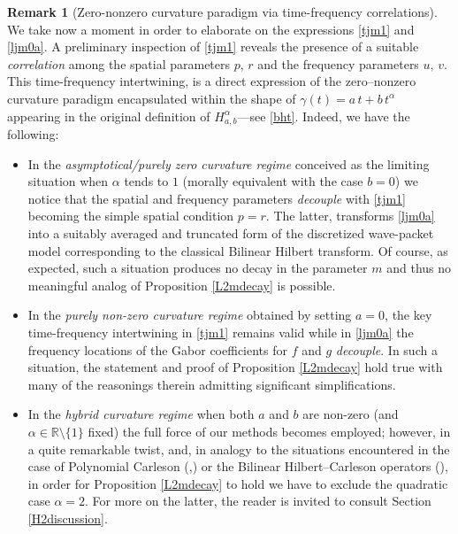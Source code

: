 \documentclass[a4paper,reqno]{amsart}
\numberwithin{equation}{section}
\theoremstyle{definition}
\newtheorem{remark}[theorem]{Remark}
\newcommand{\R}{\mathbb{R}}
\def\a{\alpha}
\def\g{\gamma}
\begin{document}
\begin{remark}[\textsf{Zero-nonzero curvature paradigm via time-frequency correlations}]\label{tfrcor} We take now a moment in order to elaborate on the expressions \eqref{tjm1} and \eqref{ljm0a}. A preliminary inspection of \eqref{tjm1} reveals the presence of a suitable \emph{correlation} among the spatial parameters $p,\,r$ and the frequency parameters $u,\,v$. This time-frequency intertwining, is a direct expression of the zero--nonzero curvature paradigm encapsulated within the shape of $\g(t)=a\,t+b\,t^\a$ appearing in the original definition of $H_{a,b}^\a$---see \eqref{bht}. Indeed, we have the following:
\begin{itemize}
\item In the \emph{asymptotical/purely zero curvature regime} conceived as the limiting situation when $\a$ tends to $1$ (morally equivalent with the case $b=0$) we notice that the spatial and frequency parameters \emph{decouple} with \eqref{tjm1} becoming the simple spatial condition $p=r$. The latter,  transforms \eqref{ljm0a} into a suitably averaged and truncated form of the discretized wave-packet model corresponding to the classical Bilinear Hilbert transform. Of course, as expected, such a situation produces no decay in the parameter $m$ and thus no meaningful analog of Proposition \ref{L2mdecay} is possible.

\item In the \emph{purely non-zero curvature regime} obtained by setting $a=0$, the key time-frequency intertwining in \eqref{tjm1} remains valid while in \eqref{ljm0a} the frequency locations of the Gabor coefficients for $f$ and $g$ \emph{decouple}. In such a situation, the statement and proof of Proposition \ref{L2mdecay} hold true with many of the reasonings therein admitting significant simplifications.

\item In the \emph{hybrid curvature regime} when both $a$ and $b$ are non-zero (and $\a\in \R\setminus\{1\}$ fixed) the full force of our methods becomes employed; however, in a quite remarkable twist, and, in analogy to the situations encountered in the case of Polynomial Carleson (\cite{Lie09},\cite{Lie20}) or the Bilinear Hilbert--Carleson operators (\cite{BBLV21}), in order for Proposition \ref{L2mdecay} to hold we have to exclude the quadratic case $\a=2$. For more on the latter, the reader is invited to consult Section \ref{H2discussion}.
\end{itemize}

\end{remark}
\end{document}
